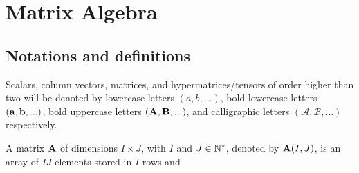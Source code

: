 \chapter{Matrix Algebra}

\section{Notations and definitions}

Scalars, column vectors, matrices, and hypermatrices/tensors of order higher than two will be 
denoted by lowercase letters $(a,b,...)$, 
bold lowercase letters $(\bold{a,b},...)$,
bold uppercase letters $(\bold{A},\bold{B},...)$,
and calligraphic letters $(\mathcal{A},\mathcal{B},...)$ respectively.

\par
A matrix $\bold{A}$ of dimensions $I\times J$, with $I$ and $J\in \mathbb{N}^*$,
denoted by $\bold{A}(I,J)$, is an array of $IJ$ elements stored in $I$ rows and 